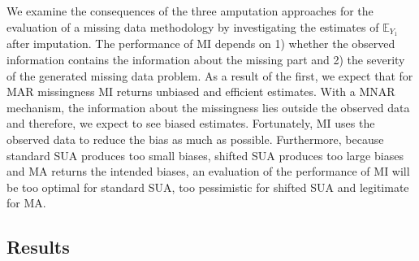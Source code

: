 \documentclass[11pt,a4paper]{article}
\begin{document}
We examine the consequences of the three amputation approaches for the evaluation of a missing data methodology by investigating the estimates of $\mathbb{E}_{Y_1}$ after imputation. The performance of MI depends on 1) whether the observed information contains the information about the missing part and 2) the severity of the generated missing data problem. As a result of the first, we expect that for MAR missingness MI returns unbiased and efficient estimates. With a MNAR mechanism, the information about the missingness lies outside the observed data and therefore, we expect to see biased estimates. Fortunately, MI uses the observed data to reduce the bias as much as possible. Furthermore, because standard SUA produces too small biases, shifted SUA produces too large biases and MA returns the intended biases, an evaluation of the performance of MI will be too optimal for standard SUA, too pessimistic for shifted SUA and legitimate for MA.  

\subsection{\normalsize Results}\label{results2}
\end{document}
